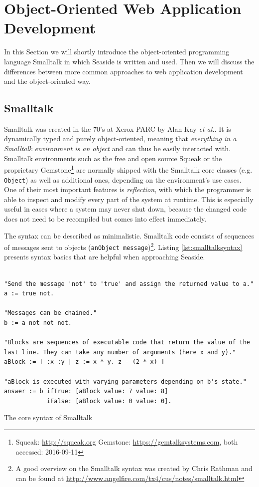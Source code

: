 \documentclass[a4paper,12pt,pagesize,headsepline,bibtotoc,titlepage]{scrartcl}
\begin{document}
\section{Object-Oriented Web Application Development}

In this Section we will shortly introduce the object-oriented programming language Smalltalk in which Seaside is written and used. Then we will discuss the differences between more common approaches to web application development and the object-oriented way.

\subsection{Smalltalk}

Smalltalk was created in the 70's at Xerox PARC by Alan Kay \emph{et al.}. It is dynamically typed and purely object-oriented, meaning that \emph{everything in a Smalltalk environment is an object} and can thus be easily interacted with. Smalltalk environments such as the free and open source Squeak or the proprietary Gemstone\footnote{Squeak: \url{http://squeak.org} Gemstone: \url{https://gemtalksystems.com}, both accessed: 2016-09-11} are normally shipped with the Smalltalk core classes (e.g. \texttt{Object}) as well as additional ones, depending on the environment's use cases. One of their most important features is \emph{reflection}, with which the programmer is able to inspect and modify every part of the system at runtime. This is especially useful in cases where a system may never shut down, because the changed code does not need to be recompiled but comes into effect immediately. 

The syntax can be described as minimalistic. Smalltalk code consists of sequences of messages sent to objects (\texttt{anObject message})\footnote{A good overview on the Smalltalk syntax was created by Chris Rathman and can be found at \url{http://www.angelfire.com/tx4/cus/notes/smalltalk.html}}. Listing \ref{lst:smalltalksyntax} presents syntax basics that are helpful when approaching Seaside.  


\begin{listing}[]%
\begin{verbatim}

"Send the message 'not' to 'true' and assign the returned value to a."
a := true not.

"Messages can be chained."
b := a not not not.

"Blocks are sequences of executable code that return the value of the 
last line. They can take any number of arguments (here x and y)."
aBlock := [ :x :y | z := x * y. z - (2 * x) ]

"aBlock is executed with varying parameters depending on b's state."
answer := b ifTrue: [aBlock value: 7 value: 8] 
            iFalse: [aBlock value: 0 value: 0].

\end{verbatim}
\caption{The core syntax of Smalltalk}
\label{lst:smalltalksyntax}
\end{listing}
\end{document}
